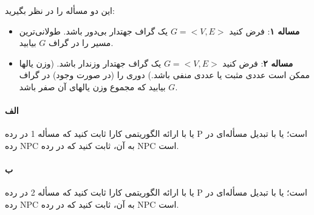 \documentclass[]{article}
\begin{document}
این دو مسأله را در نظر بگیرید:
\begin{itemize}
    \item \textbf{مساله ۱}:
    فرض کنید $G = <V, E>$ یک گراف جهتدار بی‌دور باشد. طولانی‌ترین مسیر را در گراف $G$ بیابید.
    \item \textbf{مساله ۲}:
    فرض کنید $G=<V, E>$ یک گراف جهتدار وزندار باشد.
    (وزن یالها ممکن است عددی مثبت یا عددی منفی باشد.)
    دوری را (در صورت وجود) در گراف $G$ بیابید که مجموع وزن یالهای آن صفر باشد. 
\end{itemize}

\paragraph*{الف}
یا با ارائه الگوریتمی کارا ثابت کنید که مسأله 1 در رده P است؛
یا با تبدیل مسأله‌ای در رده NPC به آن، ثابت کنید که در رده NPC است.

\paragraph*{ب}
یا با ارائه الگوریتمی کارا ثابت کنید که مسأله 2 در رده P است؛
یا با تبدیل مسأله‌ای در رده NPC به آن، ثابت کنید که در رده NPC است.
\end{document}
